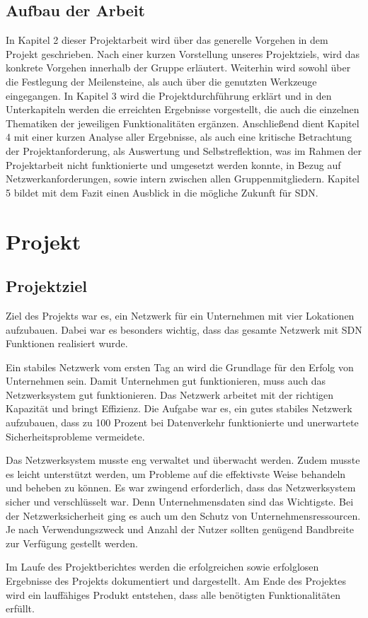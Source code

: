 \documentclass[fontsize=12pt,paper=a4,open=any,parskip=half,
  twoside=false,toc=listof,toc=bibliography,fleqn,leqno,
  captions=nooneline,captions=tableabove,british]{scrbook}
\begin{document}
\section{Aufbau der Arbeit}
In Kapitel 2 dieser Projektarbeit wird über das generelle Vorgehen in dem Projekt geschrieben. Nach einer kurzen Vorstellung unseres Projektziels, wird das konkrete Vorgehen innerhalb der Gruppe erläutert. Weiterhin wird sowohl über die Festlegung der Meilensteine, als auch über die genutzten Werkzeuge eingegangen. In Kapitel 3 wird die Projektdurchführung erklärt und in den Unterkapiteln werden die erreichten Ergebnisse vorgestellt, die auch die einzelnen Thematiken der jeweiligen Funktionalitäten ergänzen. Anschließend dient Kapitel 4 mit einer kurzen Analyse aller Ergebnisse, als auch eine kritische Betrachtung der Projektanforderung, als Auswertung und Selbstreflektion, was im Rahmen der Projektarbeit nicht funktionierte und umgesetzt werden konnte, in Bezug auf Netzwerkanforderungen, sowie intern zwischen allen Gruppenmitgliedern. Kapitel 5 bildet mit dem Fazit einen Ausblick in die mögliche Zukunft für SDN.


\chapter{Projekt}
\section{Projektziel}
Ziel des Projekts war es, ein Netzwerk für ein Unternehmen mit vier Lokationen aufzubauen. Dabei war es besonders wichtig, dass das gesamte Netzwerk mit SDN Funktionen realisiert wurde.\par
Ein stabiles Netzwerk vom ersten Tag an wird die Grundlage für den Erfolg von Unternehmen sein. Damit Unternehmen gut funktionieren, muss auch das Netzwerksystem gut funktionieren. Das Netzwerk arbeitet mit der richtigen Kapazität und bringt Effizienz. Die Aufgabe war es, ein gutes stabiles Netzwerk aufzubauen, dass zu 100 Prozent bei Datenverkehr funktionierte und unerwartete Sicherheitsprobleme vermeidete.\par
Das Netzwerksystem musste eng verwaltet und überwacht werden. Zudem musste es leicht unterstützt werden, um Probleme auf die effektivste Weise behandeln und beheben zu können. Es war zwingend erforderlich, dass das Netzwerksystem sicher und verschlüsselt war. Denn Unternehmensdaten sind das Wichtigste. Bei der Netzwerksicherheit ging es auch um den Schutz von Unternehmensressourcen. Je nach Verwendungszweck und Anzahl der Nutzer sollten genügend Bandbreite zur Verfügung gestellt werden.\par
Im Laufe des Projektberichtes werden die erfolgreichen sowie erfolglosen Ergebnisse des Projekts dokumentiert und dargestellt. Am Ende des Projektes wird ein lauffähiges Produkt entstehen, dass alle benötigten Funktionalitäten erfüllt.  
\end{document}
